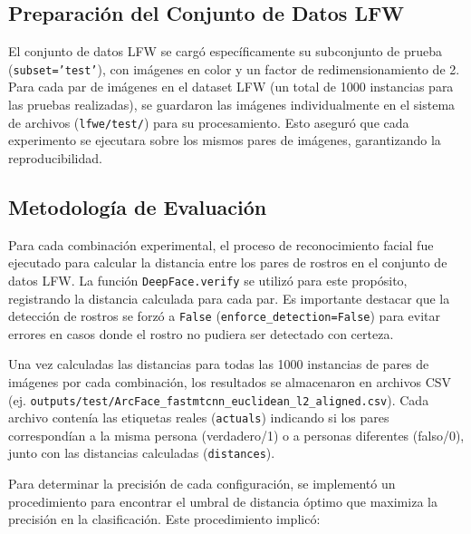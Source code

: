 \subsection{Preparación del Conjunto de Datos LFW}

El conjunto de datos LFW se cargó específicamente su subconjunto de prueba (\texttt{subset='test'}), con imágenes en color y un factor de redimensionamiento de 2. Para cada par de imágenes en el dataset LFW (un total de 1000 instancias para las pruebas realizadas), se guardaron las imágenes individualmente en el sistema de archivos (\texttt{lfwe/test/}) para su procesamiento. Esto aseguró que cada experimento se ejecutara sobre los mismos pares de imágenes, garantizando la reproducibilidad.

\subsection{Metodología de Evaluación}

Para cada combinación experimental, el proceso de reconocimiento facial fue ejecutado para calcular la distancia entre los pares de rostros en el conjunto de datos LFW. La función \texttt{DeepFace.verify} se utilizó para este propósito, registrando la distancia calculada para cada par. Es importante destacar que la detección de rostros se forzó a \texttt{False} (\texttt{enforce\_detection=False}) para evitar errores en casos donde el rostro no pudiera ser detectado con certeza.

Una vez calculadas las distancias para todas las 1000 instancias de pares de imágenes por cada combinación, los resultados se almacenaron en archivos CSV \\ (ej. \texttt{outputs/test/ArcFace\_fastmtcnn\_euclidean\_l2\_aligned.csv}). Cada archivo contenía las etiquetas reales (\texttt{actuals}) indicando si los pares correspondían a la misma persona (verdadero/1) o a personas diferentes (falso/0), junto con las distancias calculadas (\texttt{distances}).

Para determinar la precisión de cada configuración, se implementó un procedimiento para encontrar el umbral de distancia óptimo que maximiza la precisión en la clasificación. Este procedimiento implicó:

